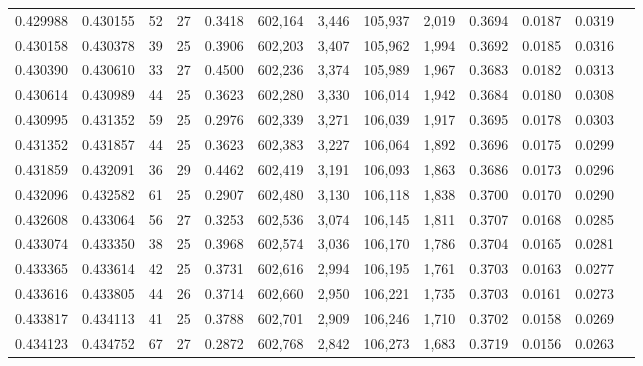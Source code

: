 \begin{tabular}{rrrrrrrrrrrrr}
0.429988 & 0.430155 &    52 &  27 &                                     0.3418 & 602,164 &   3,446 & 105,937 &   2,019 & 0.3694 & 0.0187 & 0.0319 \\
0.430158 & 0.430378 &    39 &  25 &                                     0.3906 & 602,203 &   3,407 & 105,962 &   1,994 & 0.3692 & 0.0185 & 0.0316 \\
0.430390 & 0.430610 &    33 &  27 &                                     0.4500 & 602,236 &   3,374 & 105,989 &   1,967 & 0.3683 & 0.0182 & 0.0313 \\
0.430614 & 0.430989 &    44 &  25 &                                     0.3623 & 602,280 &   3,330 & 106,014 &   1,942 & 0.3684 & 0.0180 & 0.0308 \\
0.430995 & 0.431352 &    59 &  25 &                                     0.2976 & 602,339 &   3,271 & 106,039 &   1,917 & 0.3695 & 0.0178 & 0.0303 \\
0.431352 & 0.431857 &    44 &  25 &                                     0.3623 & 602,383 &   3,227 & 106,064 &   1,892 & 0.3696 & 0.0175 & 0.0299 \\
0.431859 & 0.432091 &    36 &  29 &                                     0.4462 & 602,419 &   3,191 & 106,093 &   1,863 & 0.3686 & 0.0173 & 0.0296 \\
0.432096 & 0.432582 &    61 &  25 &                                     0.2907 & 602,480 &   3,130 & 106,118 &   1,838 & 0.3700 & 0.0170 & 0.0290 \\
0.432608 & 0.433064 &    56 &  27 &                                     0.3253 & 602,536 &   3,074 & 106,145 &   1,811 & 0.3707 & 0.0168 & 0.0285 \\
0.433074 & 0.433350 &    38 &  25 &                                     0.3968 & 602,574 &   3,036 & 106,170 &   1,786 & 0.3704 & 0.0165 & 0.0281 \\
0.433365 & 0.433614 &    42 &  25 &                                     0.3731 & 602,616 &   2,994 & 106,195 &   1,761 & 0.3703 & 0.0163 & 0.0277 \\
0.433616 & 0.433805 &    44 &  26 &                                     0.3714 & 602,660 &   2,950 & 106,221 &   1,735 & 0.3703 & 0.0161 & 0.0273 \\
0.433817 & 0.434113 &    41 &  25 &                                     0.3788 & 602,701 &   2,909 & 106,246 &   1,710 & 0.3702 & 0.0158 & 0.0269 \\
0.434123 & 0.434752 &    67 &  27 &                                     0.2872 & 602,768 &   2,842 & 106,273 &   1,683 & 0.3719 & 0.0156 & 0.0263 \\

\end{tabular}
